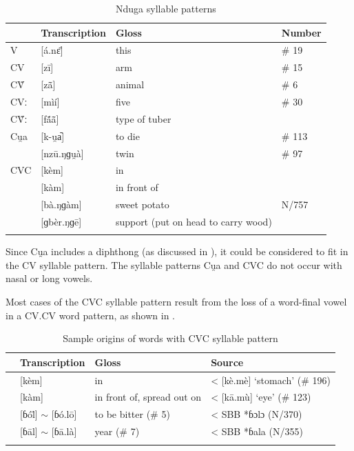 \documentclass[output=paper,colorlinks,citecolor=brown
]{langscibook}
\begin{document}
\begin{table}
\caption{Nduga syllable patterns}
\label{tab:olson:syllables}
 \begin{tabular}{llll}
  \lsptoprule
 & Transcription & Gloss & Number\\
  \midrule
 V  & [á.nɛ̄] & this & \# 19 \\
 CV & [zī] & arm & \# 15 \\
 CṼ & [zã̄] & animal & \# 6 \\
 CVː & [mìí] & five & \# 30 \\
 CṼː & [fã́ã̄] & type of tuber & \\
 Cu̯a & [k-u̯a᷆] & to die & \# 113 \\
     & [nzū.ŋɡu̯à] & twin & \# 97 \\
 CVC & [kèm] & in & \\
     & [kàm] & in front of & \\
     & [bà.ŋɡàm] & sweet potato & N/757 \\
     & [ɡbèr.ŋɡē] & support (put on head to carry wood) & \\
  \lspbottomrule
 \end{tabular}
\end{table}

Since Cu̯a includes a diphthong (as discussed in ), it could be considered to fit in the CV syllable pattern. The syllable patterns Cu̯a and CVC do not occur with nasal or long vowels.

Most cases of the CVC syllable pattern result from the loss of a word-final vowel in a CV.CV word pattern, as shown in .

\begin{table}
\caption{Sample origins of words with CVC syllable pattern}
\label{tab:olson:origin}
 \begin{tabular}{llll}
  \lsptoprule
 & Transcription & Gloss & Source \\
  \midrule
 & [kèm] & in & < [kè.mè] ‘stomach’ (\# 196) \\
 & [kàm] & in front of, spread out on & < [kā.mù] ‘eye’ (\# 123) \\
 & [ɓól̄] \(\sim \) [ɓó.lō] & to be bitter (\# 5) & < SBB *ɓɔlɔ (N/370) \\
 & [ɓāl] \(\sim \) [ɓā.là] & year (\# 7) & < SBB *ɓala (N/355) \\
  \lspbottomrule
 \end{tabular}
\end{table}
\end{document}
